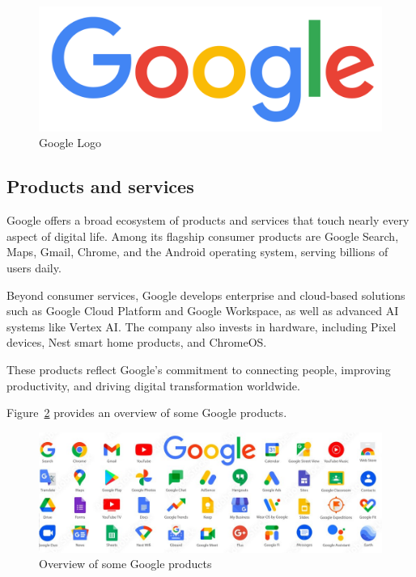 \begin{spacing}{1.2}
\begin{figure}[!ht]\centering
\includegraphics[scale=0.06]{Images/google_logo.png}
\caption{Google Logo}
\label{fig:google_logo}
\end{figure}

\subsection{Products and services} 
Google offers a broad ecosystem of products and services that touch nearly every aspect of digital life. Among its flagship consumer products are Google Search, Maps, Gmail, Chrome, and the Android operating system, serving billions of users daily. 

Beyond consumer services, Google develops enterprise and cloud-based solutions such as Google Cloud Platform and Google Workspace, as well as advanced AI systems like Vertex AI. The company also invests in hardware, including Pixel devices, Nest smart home products, and ChromeOS. 

These products reflect Google's commitment to connecting people, improving productivity, and driving digital transformation worldwide.

Figure~\ref{fig:google_products} provides an overview of some Google products.

\begin{figure}[!ht]\centering
\includegraphics[scale=1.3]{Images/google_products.jpg}
\caption{Overview of some Google products}
\label{fig:google_products}
\end{figure}


\end{spacing}
